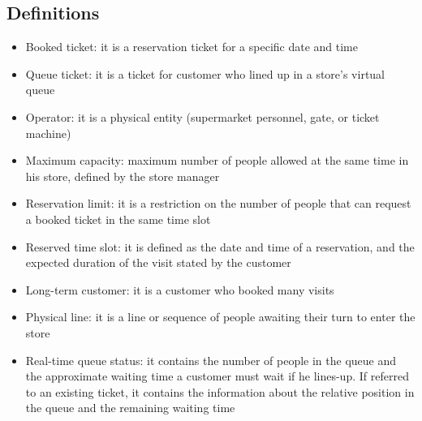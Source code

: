 \subsection{Definitions}

\begin{itemize}
\item Booked ticket: it is a reservation ticket for a specific date and time
\item  Queue ticket: it is a ticket for customer who lined up in a store’s virtual queue
\item  Operator: it is a physical entity (supermarket personnel, gate, or ticket machine)
\item  Maximum capacity: maximum number of people allowed at the same time in his store, defined by
the store manager
\item  Reservation limit: it is a restriction on the number of people that can request a booked ticket in the
same time slot
\item  Reserved time slot: it is defined as the date and time of a reservation, and the expected duration of
the visit stated by the customer
\item  Long-term customer: it is a customer who booked many visits
\item  Physical line: it is a line or sequence of people awaiting their turn to enter the store
\item  Real-time queue status: it contains the number of people in the queue and the approximate
waiting time a customer must wait if he lines-up. If referred to an existing ticket, it contains the
information about the relative position in the queue and the remaining waiting time
\end{itemize}



 
 